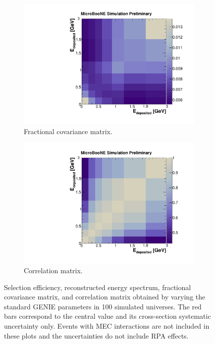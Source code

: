 \begin{figure}[htbp]
\begin{center}
\begin{subfigure}{0.48\textwidth}
      \includegraphics[width=\linewidth]{figures/frac_genie.pdf}
      \caption{Fractional covariance matrix.}\label{fig:frac_genie}
    \end{subfigure}\hfill
    \begin{subfigure}{0.48\textwidth}
      \includegraphics[width=\linewidth]{figures/corr_genie.pdf}
      \caption{Correlation matrix.}\label{fig:corr_genie}
    \end{subfigure}
    \caption{Selection efficiency, reconstructed energy spectrum, fractional covariance matrix, and correlation matrix obtained by varying the standard GENIE parameters in 100 simulated universes. The red bars correspond to the central value and its cross-section systematic uncertainty only. Events with MEC interactions are not included in these plots and the uncertainties do not include RPA effects.} \label{fig:genie_sys}
	\end{center}
\end{figure}


